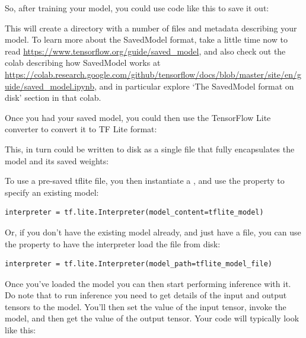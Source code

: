 So, after training your model, you could use code like this to save it out:




This will create a directory with a number of files and metadata describing your model. To learn more about the SavedModel format, take a little time now to read \url{https://www.tensorflow.org/guide/saved_model}, and also check out the colab describing how SavedModel works at \url{https://colab.research.google.com/github/tensorflow/docs/blob/master/site/en/guide/saved_model.ipynb}, and in particular explore ‘The SavedModel format on disk' section in that colab.

Once you had your saved model, you could then use the TensorFlow Lite converter to convert it to TF Lite format:



This, in turn could be written to disk as a single file that fully encapsulates the model and its saved weights:





To use a pre-saved tflite file, you then instantiate a , and use the  property to specify an existing model:

\begin{lstlisting}
interpreter = tf.lite.Interpreter(model_content=tflite_model)
\end{lstlisting}

Or, if you don’t have the existing model already, and just have a file, you can use the  property to have the interpreter load the file from disk:

\begin{lstlisting}
interpreter = tf.lite.Interpreter(model_path=tflite_model_file)
\end{lstlisting}

Once you’ve loaded the model you can then start performing inference with it. Do note that to run inference you need to get details of the input and output tensors to the model. You’ll then set the value of the input tensor, invoke the model, and then get the value of the output tensor. Your code will typically look like this:


